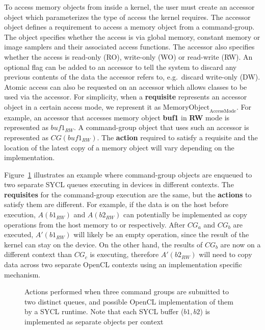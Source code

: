To access memory objects from inside a kernel, the user must create an
\gls{accessor} object which parameterizes the type of access
the kernel requires. 
The \gls{accessor} object defines a requirement to access a memory
object from a \gls{command-group}. 
The  object specifies
whether the access is via global memory, constant memory or image samplers and
their associated access functions. The \gls{accessor} also specifies whether the
access is read-only (RO), write-only (WO) or read-write (RW). 
An optional 
flag can be added to an accessor to tell the system to discard any previous
contents of the data the accessor refers to, e.g.\ discard write-only (DW). 
Atomic access can also be requested
on an accessor which allows  classes to be used via
the accessor.
For simplicity, when a \textbf{requisite} represents an accessor object  in 
a certain access mode, we represent it as 
$\text{MemoryObject}_{\text{AccessMode}}$.
For example, an accessor that accesses memory object \textbf{buf1} in \textbf{RW} 
mode is represented as $buf1_{RW}$.
A \gls{command-group} object that uses such an accessor is represented 
as $CG(buf1_{RW})$.
The \textbf{action} required to satisfy
a requisite and the location 
of the latest copy of a memory object will vary depending on the implementation.

Figure~\ref{fig:devicetodevice} 
illustrates an example where \gls{command-group}
objects are enqueued to two separate SYCL queues executing in devices in
different contexts.
The \textbf{requisites} for the \gls{command-group} execution are 
the same, but the \textbf{actions} to satisfy them are different.
For example, if the data is on the host before execution, 
$A(b1_{RW})$ and $A(b2_{RW})$ can potentially be implemented as copy 
operations from the host memory to  or 
respectively.
After $CG_a$ and $CG_b$ are executed, $A'(b1_{RW})$ will likely
be an empty operation, since the result of the kernel can stay on the device.
On the other hand, the results of $CG_b$ are now on a different
context than $CG_c$ is executing, therefore $A'(b2_{RW})$ will need to 
copy data across two separate OpenCL contexts using an implementation 
specific mechanism.

\begin{figure}[h]
\centering

\caption{Actions performed when three command groups are submitted 
to two distinct queues, and possible OpenCL implementation of them by
  a SYCL runtime. Note that each SYCL buffer ($b1,b2$) is implemented as
  separate  objects per context}
\label{fig:devicetodevice}
\end{figure}

